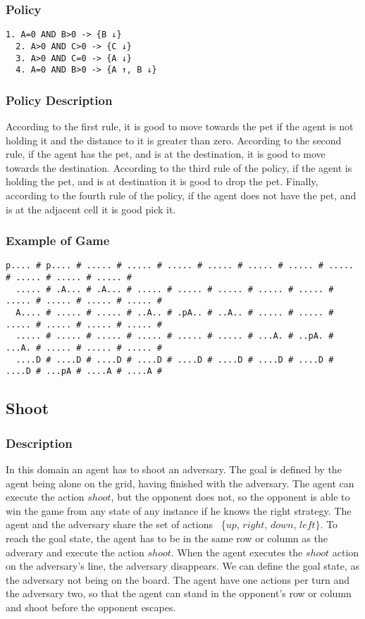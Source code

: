 \documentclass[a4paper]{article}
\begin{document}
\subsubsection{Policy}
\begin{Verbatim}[fontsize=\footnotesize]
  1. A=0 AND B>0 -> {B ↓}
  2. A>0 AND C>0 -> {C ↓}
  3. A>0 AND C=0 -> {A ↓}
  4. A=0 AND B>0 -> {A ↑, B ↓}
\end{Verbatim}

\subsubsection{Policy Description}
According to the first rule, it is good to move towards the pet if the agent is not holding it and the distance to it is greater than zero. According to the second rule, if the agent has the pet, and is at the destination, it is good to move towards the destination. According to the third rule of the policy, if the agent is holding the pet, and is at destination it is good to drop the pet. Finally, according to the fourth rule of the policy, if the agent does not have the pet, and is at the adjacent cell it is good pick it.

\subsubsection{Example of Game}
\begin{Verbatim}[fontsize=\footnotesize]
  p.... # p.... # ..... # ..... # ..... # ..... # ..... # ..... # ..... # ..... # ..... # ..... #
  ..... # .A... # .A... # ..... # ..... # ..... # ..... # ..... # ..... # ..... # ..... # ..... #
  A.... # ..... # ..... # ..A.. # .pA.. # ..A.. # ..... # ..... # ..... # ..... # ..... # ..... #
  ..... # ..... # ..... # ..... # ..... # ..... # ...A. # ..pA. # ...A. # ..... # ..... # ..... #
  ....D # ....D # ....D # ....D # ....D # ....D # ....D # ....D # ....D # ...pA # ....A # ....A #
\end{Verbatim}

\subsection{Shoot}
\subsubsection{Description}
In this domain an agent has to shoot an adversary. The goal is defined by the agent being alone on the grid, having finished with the adversary. The agent can execute the action $shoot$, but the opponent does not, so the opponent is able to win the game from any state of any instance if he knows the right strategy. The agent and the adversary share the set of actions ~\{$up$, $right$, $down$, $left\}$. To reach the goal state, the agent has to be in the same row or column as the adverary and execute the action $shoot$. When the agent executes the $shoot$ action on the adversary's line, the adversary disappears. We can define the goal state, as the adversary not being on the board. The agent have one actions per turn and the adversary two, so that the agent can stand in the opponent's row or column and shoot before the opponent escapes.
\end{document}
